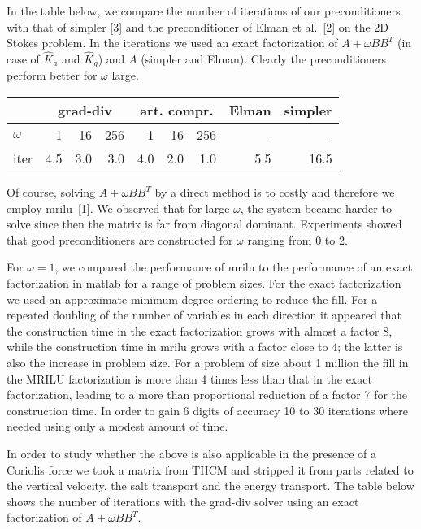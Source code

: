 \documentclass{report}
\begin{document}
In the table below, we compare the number of iterations of our
preconditioners with that of {\sc simpler} [3] and the
preconditioner of Elman et al.~[2] on the 2D Stokes problem. In
the iterations we used an exact factorization of $A+\omega BB^T$
(in case of $\hat K_a$ and $\hat K_g$) and $A$ ({\sc simpler} and
Elman). Clearly the preconditioners perform better for $\omega$
large.
\begin{center}
\begin{tabular}{l|rrr|rrr|r|r|}
&\multicolumn{3}{|c|}{\sc grad-div} &\multicolumn{3}{|c|}{\sc art.
compr.} &\sc Elman & \sc simpler\\
\hline
$\omega$ & 1 & 16 & 256 & 1 & 16 & 256 & - & - \\
\sc iter& 4.5 & 3.0 & 3.0& 4.0 & 2.0 & 1.0 & 5.5& 16.5 \\
\hline
\end{tabular}
\end{center}

Of course, solving $A+\omega BB^T$ by a direct method is to
costly and therefore we employ {\sc mrilu}~[1]. We observed that
for large $\omega$, the system became harder to solve since then
the matrix is far from diagonal dominant. Experiments showed that
good preconditioners are constructed for $\omega$ ranging from 0
to 2.

For $\omega=1$, we compared the performance of {\sc mrilu} to the
performance of an exact factorization in {\sc matlab} for a range
of problem sizes. For the exact factorization we used an
approximate minimum degree ordering to reduce the fill. For a
repeated doubling of the number of variables in each direction it
appeared that the construction time in the exact factorization
grows with almost a factor $8$, while the construction time in
{\sc mrilu} grows with a factor close to $4$; the latter is also
the increase in problem size. For a problem of size about 1
million the fill in the {\sc MRILU} factorization is more than 4
times less than that in the exact factorization, leading to a more
than proportional reduction of a factor 7 for the construction
time. In order to gain 6 digits of accuracy 10 to 30 iterations
where needed using only a modest amount of time.

In order to study whether the above is also applicable in the presence of a
Coriolis force we took a matrix from THCM and stripped it from parts related to
the vertical velocity, the salt transport and the energy
transport. The table below shows the number of iterations with the
grad-div solver using an exact factorization of $A+\omega BB^T$.
\end{document}
